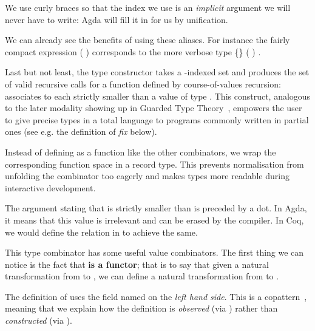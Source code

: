 
 We use curly braces so that the
index we use is an \emph{implicit} argument we will never
have to write: Agda will fill it in for us by unification.
\medskip{}

We can already see the benefits of using these aliases. For instance
the fairly compact expression \AF{[} (   )   \AF{]}
corresponds to the more verbose type
 \{\}  (   )   .


Last but not least, the \BOX{} type constructor takes a -indexed
set and produces the set of valid recursive calls for a function defined
by course-of-values recursion: \BOX{}   associates to each
 strictly smaller than  a value of type  .
This construct, analogous to the later modality showing up in Guarded
Type Theory~\cite{vezzosi2015guarded}, empowers the user to give precise
types in a total language to programs commonly written in partial ones
(see e.g. the definition of \textit{fix} below).


 Instead of defining \BOX{} as a
function like the other combinators, we wrap the corresponding
function space in a record type. This prevents normalisation from
unfolding the combinator too eagerly and makes types more readable
during interactive development.

 The argument stating that  is strictly
smaller than  is preceded by a dot. In Agda, it means that
this value is irrelevant and can be erased by the compiler.
In Coq, we would define the relation \AF{\_<\_} in  to
achieve the same.

\medskip{}

This \BOX{} type combinator has some useful value combinators.
The first thing we can notice is the fact that \textbf{\BOX{} is a
functor}; that is to say that given a natural transformation from
 to , we can define a natural transformation from
\BOX{}  to \BOX{} .


 The definition of  uses
the \BOX{} field named  on the \emph{left hand side}.
This is a copattern~\cite{abel2013copatterns}, meaning that we
explain how the definition is \emph{observed} (via )
rather than \emph{constructed} (via ).

